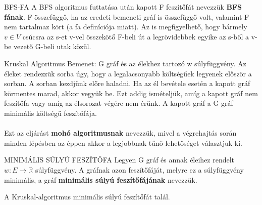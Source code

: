 \begin{definicio}{BFS-FA}
  A BFS algoritmus futtatása után kapott F feszítőfát nevezzük \textbf{BFS fának}. F összefüggő, ha az eredeti bemeneti gráf is összefüggő volt, valamint F nem tartalmaz kört (a fa definíciója miatt). Az is megfigyelhető, hogy bármely $v \in V$ csúcsra az s-et v-vel összekötő F-beli út a legrövidebbek egyike az s-ből a v-be vezető G-beli utak közül.
\end{definicio}

\begin{tetel}{Kruskal Algoritmus}
Bemenet: G gráf és az élekhez tartozó w súlyfüggvény. Az éleket rendezzük sorba úgy, hogy a legalacsonyabb költségűek legyenek először a sorban. A sorban kezdjünk előre haladni. Ha az él bevétele esetén a kapott gráf körmentes marad, akkor vegyük be. Ezt addig ismételjük, amíg  a kapott gráf nem feszítőfa vagy amíg az élsorozat végére nem érünk. A kapott gráf a G gráf minimális költségű feszítőfája.
\\
\\
Ezt az eljárást \textbf{mohó algoritmusnak} nevezzük, mivel a végrehajtás során minden lépésben az éppen akkor a legjobbnak tűnő lehetőséget választjuk ki.
\end{tetel}

\begin{definicio}{MINIMÁLIS SÚLYÚ FESZÍTŐFA}
Legyen G gráf és annak éleihez rendelt $w: E \rightarrow \mathbb{R}$ súlyfüggvény. A gráfnak azon feszítőfáját, melyre ez a súlyfüggvény minimális, a gráf \textbf{minimális súlyú feszítőfájának} nevezzük.
\end{definicio}

\begin{tetel}{}
A Kruskal-algoritmus minimális súlyú feszítőfát talál.
\end{tetel}

